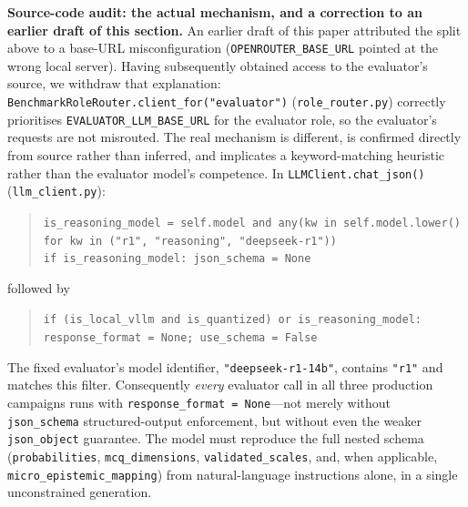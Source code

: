 \documentclass[11pt,journal,onecolumn]{IEEEtran}
\begin{document}
\textbf{Source-code audit: the actual mechanism, and a correction to an earlier draft of this section.} An earlier draft of this paper attributed the split above to a base-URL misconfiguration (\texttt{OPENROUTER\_BASE\_URL} pointed at the wrong local server). Having subsequently obtained access to the evaluator's source, we withdraw that explanation: \texttt{BenchmarkRoleRouter.client\_for("evaluator")} (\texttt{role\_router.py}) correctly prioritises \texttt{EVALUATOR\_LLM\_BASE\_URL} for the evaluator role, so the evaluator's requests are not misrouted. The real mechanism is different, is confirmed directly from source rather than inferred, and implicates a keyword-matching heuristic rather than the evaluator model's competence. In \texttt{LLMClient.chat\_json()} (\texttt{llm\_client.py}):
\begin{quote}
\texttt{is\_reasoning\_model = self.model and any(kw in self.model.lower() for kw in ("r1", "reasoning", "deepseek-r1"))} \\
\texttt{if is\_reasoning\_model: json\_schema = None}
\end{quote}
followed by
\begin{quote}
\texttt{if (is\_local\_vllm and is\_quantized) or is\_reasoning\_model: response\_format = None; use\_schema = False}
\end{quote}
The fixed evaluator's model identifier, \texttt{"deepseek-r1-14b"}, contains \texttt{"r1"} and matches this filter. Consequently \emph{every} evaluator call in all three production campaigns runs with \texttt{response\_format = None}---not merely without \texttt{json\_schema} structured-output enforcement, but without even the weaker \texttt{json\_object} guarantee. The model must reproduce the full nested schema (\texttt{probabilities}, \texttt{mcq\_dimensions}, \texttt{validated\_scales}, and, when applicable, \texttt{micro\_epistemic\_mapping}) from natural-language instructions alone, in a single unconstrained generation.
\end{document}
